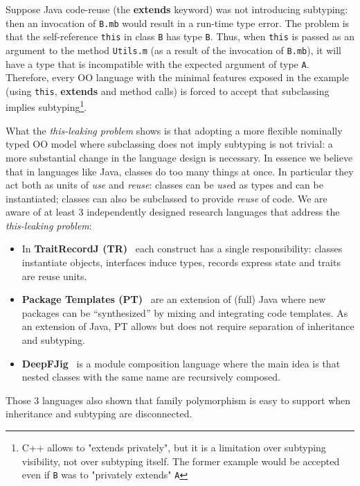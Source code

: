 Suppose Java code-reuse (the {\bf extends} keyword) was not introducing subtyping: then an invocation of 
\lstinline{B.mb} would result in a run-time type error.
The problem is that the
self-reference \lstinline{this} in class \lstinline{B} has 
type \lstinline{B}. Thus, when \lstinline{this} is passed as an argument to 
the method \lstinline{Utils.m} (as a result of the invocation of
\lstinline{B.mb}), it will have a type that is incompatible with the
expected argument of type \lstinline{A}.  
Therefore, every OO language with the minimal features exposed in the example (using \lstinline{this},
{\bf extends} and method calls) is forced to accept that subclassing implies
subtyping\footnote{C++ allows to "extends privately", but it is a limitation over
  subtyping visibility, not over subtyping itself.  The
  former example would be accepted even if \lstinline{B} was to
  "privately extends" \lstinline{A}}.
  

What the \emph{this-leaking problem} shows is that adopting a more flexible
nominally typed OO model where subclassing does not imply subtyping is
not trivial: a more substantial change in the language design is
necessary.  In essence we believe that in languages like Java, classes do too many
things at once. In particular they act both as units of \emph{use} and
\emph{reuse}: classes can be \emph{use}d as types and can be instantiated;
classes can also be subclassed to provide \emph{reuse} of code.
We are aware of at least 3 independently designed research
languages that address the \emph{this-leaking problem}:
\begin{itemize}
\item In {\bf TraitRecordJ (TR)}~\cite{Bettini:2010:ISP:1774088.1774530,BETTINI2013521,Bettini2015282}
each construct has a single responsibility: classes instantiate objects,
interfaces induce types, records express state and traits are reuse units.
\item {\bf Package Templates (PT)}~\cite{KrogdahlMS09,DBLP:journals/taosd/AxelsenSKM12,DBLP:conf/gpce/AxelsenK12}
are an extension of (full) Java where new packages can be ``synthesized'' by mixing
and integrating code templates. As an extension of Java, PT allows but does not require
separation of inheritance and subtyping.
\item {\bf
    DeepFJig}~\cite{deep,servetto2014meta,fjig} is
a module composition language where the main idea is that
nested classes with the same name are recursively composed.
\end{itemize}
Those 3 languages also shown that family polymorphism 
is easy to support when inheritance and subtyping are disconnected.


